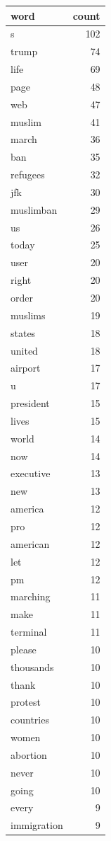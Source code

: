 \begin{tabular}{lr}
\toprule
word & count \\
\midrule
s & 102 \\
trump & 74 \\
life & 69 \\
page & 48 \\
web & 47 \\
muslim & 41 \\
march & 36 \\
ban & 35 \\
refugees & 32 \\
jfk & 30 \\
muslimban & 29 \\
us & 26 \\
today & 25 \\
user & 20 \\
right & 20 \\
order & 20 \\
muslims & 19 \\
states & 18 \\
united & 18 \\
airport & 17 \\
u & 17 \\
president & 15 \\
lives & 15 \\
world & 14 \\
now & 14 \\
executive & 13 \\
new & 13 \\
america & 12 \\
pro & 12 \\
american & 12 \\
let & 12 \\
pm & 12 \\
marching & 11 \\
make & 11 \\
terminal & 11 \\
please & 10 \\
thousands & 10 \\
thank & 10 \\
protest & 10 \\
countries & 10 \\
women & 10 \\
abortion & 10 \\
never & 10 \\
going & 10 \\
every & 9 \\
immigration & 9 \\

\end{tabular}
